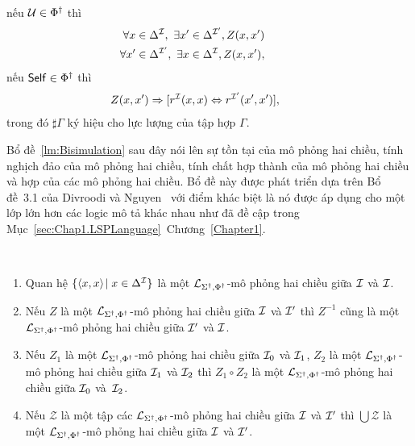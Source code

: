 \begin{Definition}[Mô phỏng hai chiều]
	nếu $\mathcal{U} \in \Phi^\dag$ thì
	\begin{eqnarray}
		&&\!\!\!\!\!\!\!\!\!\!\!\!\!\!\!\!\!\!\!\!\!\!\!\! 
		\V x \in \Delta^\mI,\ \E x' \in \Delta^{\mI'}, Z(x,x') \label{bs:eqU1} \\
		&&\!\!\!\!\!\!\!\!\!\!\!\!\!\!\!\!\!\!\!\!\!\!\!\! 
		\V x' \in \Delta^{\mI'},\ \E x \in \Delta^\mI, Z(x,x'), \label{bs:eqU2}
	\end{eqnarray}
	nếu $\mathsf{Self} \in \Phi^\dag$ thì
	\begin{eqnarray}
		&&\!\!\!\!\!\!\!\!\!\!\!\!\!\!\!\!\!\!\!\!\!
		Z(x,x') \Rightarrow [r^\mI(x,x) \Leftrightarrow r^{\mI'}(x',x')], \label{bs:eqSelf}
	\end{eqnarray}
	trong đó $\sharp\Gamma$ ký hiệu cho lực lượng của tập hợp $\Gamma$.\myend
\end{Definition}

Bổ đề~\ref{lm:Bisimulation} sau đây nói lên sự tồn tại của mô phỏng hai chiều, tính nghịch đảo của mô phỏng hai chiều, tính chất hợp thành của mô phỏng hai chiều và hợp của các mô phỏng hai chiều. 
Bổ đề này được phát triển dựa trên Bổ đề~3.1 của Divroodi và Nguyen~\cite{Divroodi2011B} với điểm khác biệt là nó được áp dụng cho một lớp lớn hơn các logic mô tả khác nhau như đã đề cập trong Mục~\ref{sec:Chap1.LSPLanguage}~Chương~\ref{Chapter1}.
\begin{Lemma}
\label{lm:Bisimulation}~
	\begin{enumerate}
		\item Quan hệ $\{\left\langle x,x\right\rangle\! \mid x \in \Delta^{\mathcal{I}}\}$ là một $\mathcal{L}_{\Sigma^\dag,\Phi^\dag}$-mô phỏng hai chiều giữa $\mathcal{I}$ và $\mathcal{I}$.\label{lm:item1}
		\item Nếu $Z$ là một $\mathcal{L}_{\Sigma^\dag,\Phi^\dag}$-mô phỏng hai chiều giữa $\mathcal{I}$ và $\mathcal{I}'$ thì $Z^{-1}$ cũng là một $\mathcal{L}_{\Sigma^\dag,\Phi^\dag}$-mô phỏng hai chiều giữa $\mathcal{I}'$ và $\mathcal{I}$.\label{lm:item2}
		\item Nếu $Z_1$ là một $\mathcal{L}_{\Sigma^\dag,\Phi^\dag}$-mô phỏng hai chiều giữa $\mathcal{I}_0$ và $\mathcal{I}_1$, $Z_2$ là một $\mathcal{L}_{\Sigma^\dag,\Phi^\dag}$-mô phỏng hai chiều giữa $\mathcal{I}_1$ và $\mathcal{I}_2$ thì $Z_1 \circ Z_2$ là một $\mathcal{L}_{\Sigma^\dag,\Phi^\dag}$-mô phỏng hai chiều giữa $\mathcal{I}_0$ và~$\mathcal{I}_2$.\label{lm:item3}
		\item Nếu $\mathcal{Z}$ là một tập các $\mathcal{L}_{\Sigma^\dag,\Phi^\dag}$-mô phỏng hai chiều giữa $\mathcal{I}$ và $\mathcal{I}'$ thì $\bigcup \mathcal{Z}$ là một $\mathcal{L}_{\Sigma^\dag,\Phi^\dag}$-mô phỏng hai chiều giữa $\mathcal{I}$ và $\mathcal{I}'$.\label{lm:item4}
	\end{enumerate}
\end{Lemma}

